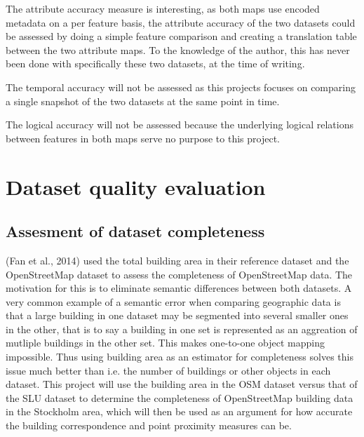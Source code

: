 \documentclass[a4paper]{article}
\begin{document}
The attribute accuracy measure is interesting, as both maps use encoded metadata on a per feature basis, the attribute accuracy of the two datasets could be assessed by doing a simple feature comparison and creating a translation table between the two attribute maps. To the knowledge of the author, this has never been done with specifically these two datasets, at the time of writing.

The temporal accuracy will not be assessed as this projects focuses on comparing a single snapshot of the two datasets at the same point in time.

The logical accuracy will not be assessed because the underlying logical relations between features in both maps serve no purpose to this project.

\section{Dataset quality evaluation}

\subsection{Assesment of dataset completeness}

(Fan et al., 2014) used the total building area in their reference dataset and the OpenStreetMap dataset to assess the completeness of OpenStreetMap data. The motivation for this is to eliminate semantic differences between both datasets. A very common example of a semantic error when comparing geographic data is that a large building in one dataset may be segmented into several smaller ones in the other, that is to say a building in one set is represented as an aggreation of mutliple buildings in the other set. This makes one-to-one object mapping impossible. Thus using building area as an estimator for completeness solves this issue much better than i.e. the number of buildings or other objects in each dataset.
This project will use the building area in the OSM dataset versus that of the SLU dataset to determine the completeness of OpenStreetMap building data in the Stockholm area, which will then be used as an argument for how accurate the building correspondence and point proximity measures can be.
\end{document}
